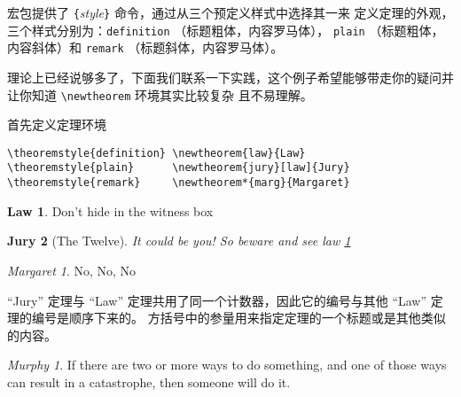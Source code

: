 %

 宏包提供了 \verb|{|\emph{style}\verb|}| 命令，通过从三个预定义样式中选择其一来
定义定理的外观，三个样式分别为：\texttt{definition} （标题粗体，内容罗马体），
\texttt{plain} （标题粗体，内容斜体）和 \texttt{remark} 
（标题斜体，内容罗马体）。

理论上已经说够多了，下面我们联系一下实践，这个例子希望能够带走你的疑问并让你知道 \verb|\newtheorem| 环境其实比较复杂
且不易理解。
\theoremstyle{definition} \newtheorem{law}{Law}
\theoremstyle{plain}      \newtheorem{jury}[law]{Jury}
\theoremstyle{remark}     \newtheorem*{marg}{Margaret}

首先定义定理环境
\begin{verbatim}
\theoremstyle{definition} \newtheorem{law}{Law}
\theoremstyle{plain}      \newtheorem{jury}[law]{Jury}
\theoremstyle{remark}     \newtheorem*{marg}{Margaret}
\end{verbatim}

\begin{example}
\begin{law} \label{law:box}
Don't hide in the witness box
\end{law}
\begin{jury}[The Twelve]
It could be you! So beware and
see law \ref{law:box}\end{jury}
\begin{marg}No, No, No\end{marg}
\end{example}

“Jury” 定理与 “Law” 定理共用了同一个计数器，因此它的编号与其他 “Law” 定理的编号是顺序下来的。
方括号中的参量用来指定定理的一个标题或是其他类似的内容。
\begin{example}
\flushleft
\newtheorem{mur}{Murphy}[section]
\begin{mur}
If there are two or more
ways to do something, and
one of those ways can result
in a catastrophe, then
someone will do it.\end{mur}
\end{example}

